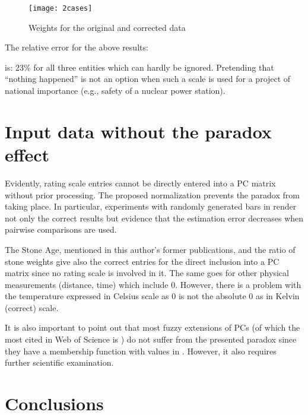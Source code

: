 \documentclass [12pt]{article}
\begin{document}
\begin{figure}[h]
\centering
\texttt{[image: 2cases]}
\caption[Weights for the original and corrected data]{Weights for the original and corrected data}
\label{fig:2cases}
\end{figure}



\noindent The relative error for the above results:


\noindent is: 23\% for all three entities which can hardly be ignored. Pretending that ``nothing happened'' is not an option when such a scale is used for a project of national importance (e.g., safety of a nuclear power station).\\

\section{Input data without the paradox effect}

Evidently, rating scale entries cannot be directly entered into a PC matrix without prior processing. The proposed  normalization prevents the paradox from taking place. In particular, experiments with randomly generated bars in \cite{Kocz1996, Kocz1998} render not only the correct results but evidence that the estimation error decreases when pairwise comparisons are used.

The Stone Age, mentioned in this author's former publications, and the ratio of stone weights give also the correct entries for the direct inclusion into a PC matrix since no rating scale is involved in it. The same goes for other physical measurements (distance, time) which include 0. However, there is a problem with the temperature expressed in Celsius scale as 0 is not the absolute 0 as in Kelvin (correct) scale.

It is also important to point out that most fuzzy extensions of PCs (of which the most cited in Web of Science is \cite{VP1983}) do not suffer from the presented paradox since they have a membership function with values in . However, it also requires further scientific examination.

\section{Conclusions}
\end{document}
